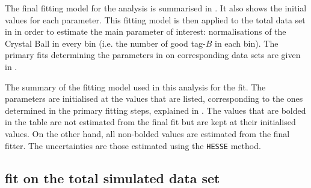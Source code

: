 The final \Mbc fitting model for the analysis is summarised in .
It also shows the initial values for each parameter.
This fitting model is then applied to the total data set in  
in order to estimate the main parameter of interest: 
normalisations of the Crystal Ball in every \EB bin (i.e. the number of good tag-$B$ in each \EB bin).
The primary \Mbc fits determining the parameters in 
 on corresponding data sets are given in . 
\begin{table}[htbp!]
    \centering
    \caption{\label{tab:fitting_init_params} 
    The summary of the fitting model used in this analysis for the \Mbc fit.
    The parameters are initialised at the values that are listed, corresponding to the ones determined in the primary fitting steps, explained in .
    The values that are bolded in the table are not estimated from the final \Mbc fit but are kept at their initialised values.
    On the other hand, all non-bolded values are estimated from the final fitter.
    The uncertainties are those estimated using the \texttt{HESSE} method.
    }

\end{table}

\subsection{\texorpdfstring{\Mbc}{Mbc} fit on the total simulated data set}\label{sec:mbc_fit_full_mc}

